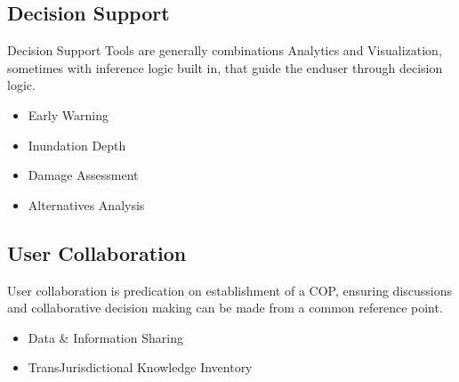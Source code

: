 \documentclass[letterpaper,10pt,english]{sphinxmanual}
\begin{document}
\subsection{Decision Support}
\label{\detokenize{requirements/wisdom/dss:decision-support}}\label{\detokenize{requirements/wisdom/dss::doc}}
\sphinxAtStartPar
Decision Support Tools are generally combinations Analytics and Visualization,
sometimes with inference logic built in, that guide the end\sphinxhyphen{}user through
decision logic.
\begin{itemize}
\item {} 
\sphinxAtStartPar
Early Warning

\item {} 
\sphinxAtStartPar
Inundation Depth

\item {} 
\sphinxAtStartPar
Damage Assessment

\item {} 
\sphinxAtStartPar
Alternatives Analysis

\end{itemize}


\subsection{User Collaboration}
\label{\detokenize{requirements/wisdom/collaboration:user-collaboration}}\label{\detokenize{requirements/wisdom/collaboration::doc}}
\sphinxAtStartPar
User collaboration is predication on establishment of a COP, ensuring
discussions and collaborative decision making can be made from a common
reference point.
\begin{itemize}
\item {} 
\sphinxAtStartPar
Data \& Information Sharing

\item {} 
\sphinxAtStartPar
Trans\sphinxhyphen{}Jurisdictional Knowledge Inventory

\end{itemize}
\end{document}
